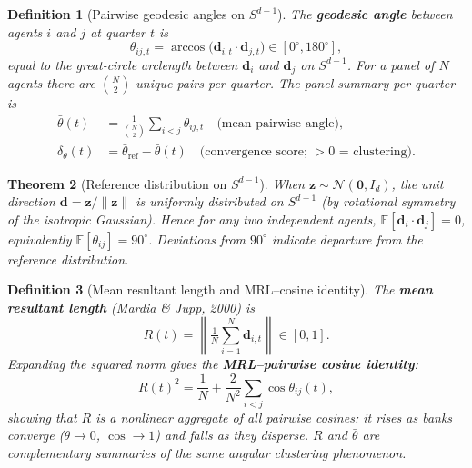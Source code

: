\documentclass[11pt,a4paper]{article}
\newtheorem{theorem}{Theorem}
\newtheorem{definition}[theorem]{Definition}
\begin{document}
\begin{definition}[Pairwise geodesic angles on $S^{d-1}$]
The \textbf{geodesic angle} between agents $i$ and $j$ at quarter $t$ is
\begin{equation}
  \theta_{ij,t} = \arccos\!\bigl(\mathbf{d}_{i,t}\cdot\mathbf{d}_{j,t}\bigr)
  \in [0^\circ, 180^\circ],
  \label{eq:theta_ij_main}
\end{equation}
equal to the great-circle arclength between $\mathbf{d}_i$ and $\mathbf{d}_j$
on $S^{d-1}$.  For a panel of $N$ agents there are $\binom{N}{2}$ unique
pairs per quarter.  The panel summary per quarter is
\begin{align}
  \bar\theta(t) &= \tfrac{1}{\binom{N}{2}}\sum_{i<j}\theta_{ij,t}
  \quad\text{(mean pairwise angle)},\label{eq:thetamean_main}\\
  \delta_\theta(t) &= \bar\theta_{\mathrm{ref}} - \bar\theta(t)
  \quad\text{(convergence score; $>0$ = clustering).}\label{eq:dtheta_main}
\end{align}
\end{definition}

\begin{theorem}[Reference distribution on $S^{d-1}$]
\label{thm:theta_h0_main}
When $\mathbf{z}\sim\mathcal{N}(\mathbf{0},I_d)$, the unit direction
$\mathbf{d} = \mathbf{z}/\|\mathbf{z}\|$ is uniformly distributed on
$S^{d-1}$ (by rotational symmetry of the isotropic Gaussian).  Hence
for any two independent agents,
$\mathbb{E}[\mathbf{d}_i\cdot\mathbf{d}_j]=0$, equivalently
$\mathbb{E}[\theta_{ij}]=90^\circ$.  Deviations from $90^\circ$ indicate
departure from the reference distribution.
\end{theorem}

\begin{definition}[Mean resultant length and MRL--cosine identity]
The \textbf{mean resultant length} (Mardia \& Jupp, 2000) is
\begin{equation}
  R(t) = \left\|\tfrac{1}{N}\sum_{i=1}^N \mathbf{d}_{i,t}\right\| \in [0,1].
  \label{eq:R_main}
\end{equation}
Expanding the squared norm gives the \textbf{MRL--pairwise cosine identity}:
\begin{equation}
  R(t)^2 = \frac{1}{N} + \frac{2}{N^2}\sum_{i<j}\cos\theta_{ij}(t),
  \label{eq:R2_main}
\end{equation}
showing that $R$ is a nonlinear aggregate of all pairwise cosines: it
rises as banks converge ($\theta\to0$, $\cos\to1$) and falls as they disperse.
$R$ and $\bar\theta$ are complementary summaries of the same angular
clustering phenomenon.
\end{definition}
\end{document}
